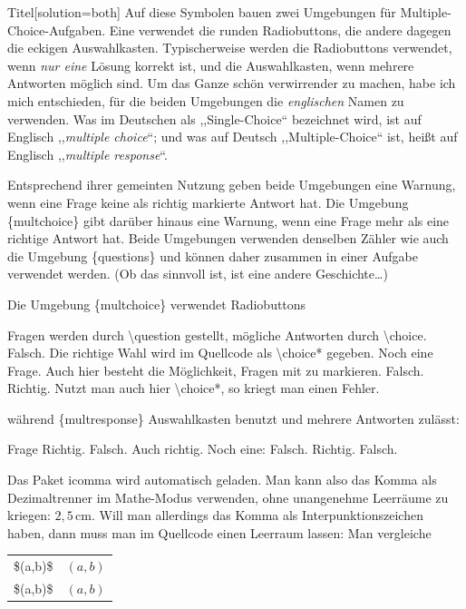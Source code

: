 \documentclass[hyperworksheet,pgfplots]{drcschool}
\newcommand*{\cs}[1]{\textup{\ttfamily\textbackslash#1}}                   %
\newcommand*{\pkg}[1]{\textup{\ttfamily#1}}                                %
\newcommand*{\opt}[1]{\textup{\ttfamily#1}}                                %
\newcommand*{\env}[1]{\textup{\ttfamily\{#1\}}}                            %
\begin{document}
\begin{worksheet}{Titel}[solution=both]
Auf diese Symbolen bauen zwei Umgebungen für Multiple-Choice-Aufgaben. Eine
verwendet die runden Radiobuttons, die andere dagegen die eckigen Auswahlkasten.
Typischerweise werden die Radiobuttons verwendet, wenn \emph{nur eine} Lösung
korrekt ist, und die Auswahlkasten, wenn mehrere Antworten möglich sind. Um das
Ganze schön verwirrender zu machen, habe ich mich entschieden, für die beiden
Umgebungen die \emph{englischen} Namen zu verwenden. Was im Deutschen als
,,Single-Choice`` bezeichnet wird, ist auf Englisch ,,\emph{multiple choice}``;
und was auf Deutsch ,,Multiple-Choice`` ist, heißt auf Englisch
,,\emph{multiple response}``.

Entsprechend ihrer gemeinten Nutzung geben beide Umgebungen eine Warnung,
wenn eine Frage keine als richtig markierte Antwort hat. Die Umgebung \env{multchoice}
gibt darüber hinaus eine Warnung, wenn eine Frage mehr als eine richtige Antwort
hat. Beide Umgebungen verwenden denselben Zähler wie auch die Umgebung
\env{questions} und können daher zusammen in einer Aufgabe
verwendet werden. (Ob das sinnvoll ist, ist eine andere Geschichte\ldots)

Die Umgebung \env{multchoice} verwendet Radiobuttons
\begin{multchoice}
\question Fragen werden durch \cs{question} gestellt,
   \choice mögliche Antworten durch \cs{choice}.
   \choice Falsch.
   \choice* Die richtige Wahl wird im Quellcode als \cs{choice*} gegeben.
\question* Noch eine Frage. Auch hier besteht die Möglichkeit, Fragen mit \opt{*} zu markieren.
   \choice Falsch.
   \choice* Richtig.
   \choice Nutzt man auch hier \cs{choice*}, so kriegt man einen Fehler.
\end{multchoice}
während \env{multresponse} Auswahlkasten benutzt und mehrere Antworten zulässt:
\begin{multresponse}
\question Frage
   \choice* Richtig.
   \choice Falsch.
   \choice* Auch richtig.
\question Noch eine:
   \choice Falsch.
   \choice* Richtig.
   \choice Falsch.
\end{multresponse}

Das Paket \pkg{icomma} wird automatisch geladen. Man kann also das Komma als Dezimaltrenner
im Mathe-Modus verwenden, ohne unangenehme Leerräume zu kriegen: $2,5\,\mathrm{cm}$.
Will man allerdings das Komma als Interpunktionszeichen haben, dann muss man im Quellcode
einen Leerraum lassen: Man vergleiche
\begin{tabular}[t]{l@{\space\textrightarrow\space}l}
\opt{\$(a,b)\$}  & $(a,b)$ \\
\opt{\$(a,\textvisiblespace b)\$} & $(a, b)$
\end{tabular}

\end{worksheet}
\end{document}
